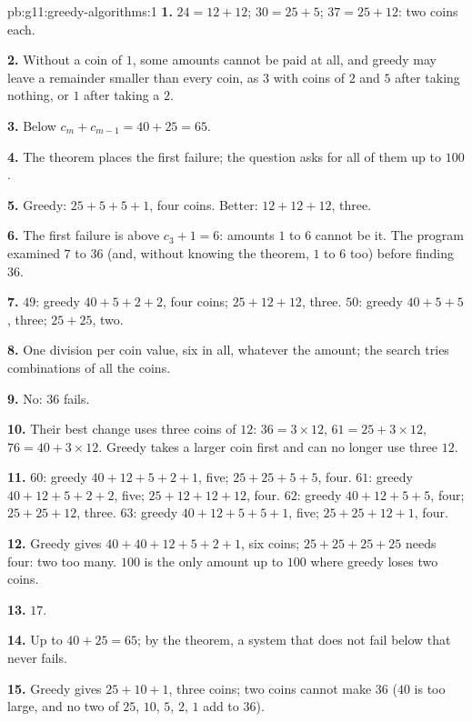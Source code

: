 \begin{solution}{pb:g11:greedy-algorithms:1}
\textbf{1.} $24 = 12 + 12$; $30 = 25 + 5$; $37 = 25 + 12$: two coins each.

\textbf{2.} Without a coin of $1$, some amounts cannot be paid at all, and greedy may leave a remainder smaller than
every coin, as $3$ with coins of $2$ and $5$ after taking nothing, or $1$ after taking a $2$.

\textbf{3.} Below $c_m + c_{m-1} = 40 + 25 = 65$.

\textbf{4.} The theorem places the first failure; the question asks for all of them up to $100$.

\textbf{5.} Greedy: $25 + 5 + 5 + 1$, four coins. Better: $12 + 12 + 12$, three.

\textbf{6.} The first failure is above $c_3 + 1 = 6$: amounts $1$ to $6$ cannot be it. The program examined $7$ to $36$
(and, without knowing the theorem, $1$ to $6$ too) before finding $36$.

\textbf{7.} $49$: greedy $40 + 5 + 2 + 2$, four coins; $25 + 12 + 12$, three. $50$: greedy $40 + 5 + 5$, three;
$25 + 25$, two.

\textbf{8.} One division per coin value, six in all, whatever the amount; the search tries combinations of all the
coins.

\textbf{9.} No: $36$ fails.

\textbf{10.} Their best change uses three coins of $12$: $36 = 3 \times 12$, $61 = 25 + 3 \times 12$,
$76 = 40 + 3 \times 12$. Greedy takes a larger coin first and can no longer use three $12$.

\textbf{11.} $60$: greedy $40 + 12 + 5 + 2 + 1$, five; $25 + 25 + 5 + 5$, four. $61$: greedy $40 + 12 + 5 + 2 + 2$,
five; $25 + 12 + 12 + 12$, four. $62$: greedy $40 + 12 + 5 + 5$, four; $25 + 25 + 12$, three. $63$: greedy
$40 + 12 + 5 + 5 + 1$, five; $25 + 25 + 12 + 1$, four.

\textbf{12.} Greedy gives $40 + 40 + 12 + 5 + 2 + 1$, six coins; $25 + 25 + 25 + 25$ needs four: two too many. $100$
is the only amount up to $100$ where greedy loses two coins.

\textbf{13.} $17$.

\textbf{14.} Up to $40 + 25 = 65$; by the theorem, a system that does not fail below that never fails.

\textbf{15.} Greedy gives $25 + 10 + 1$, three coins; two coins cannot make $36$ ($40$ is too large, and no two of
$25$, $10$, $5$, $2$, $1$ add to $36$).


\end{solution}
